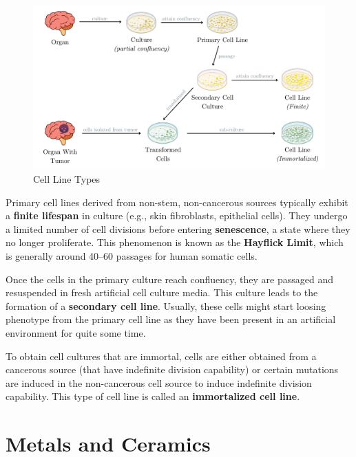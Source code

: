 \documentclass[12pt]{article}
\begin{document}
\begin{figure}[htbp]
    \centering
    \includegraphics[width=1\textwidth]{figures/chapter_1/cell_cultures.png}
    \caption{Cell Line Types}\label{fig:cell_line_types}
\end{figure}

Primary cell lines derived from non-stem, non-cancerous sources typically
exhibit a \textbf{finite lifespan} in culture (e.g., skin fibroblasts,
epithelial cells). They undergo a limited number of cell divisions before
entering \textbf{senescence}, a state where they no longer proliferate. This
phenomenon is known as the \textbf{Hayflick Limit}, which is generally around
40--60 passages for human somatic cells.

Once the cells in the primary culture reach confluency, they are passaged and
resuspended in fresh artificial cell culture media. This culture leads to the
formation of a \textbf{secondary cell line}. Usually, these cells might start
loosing phenotype from the primary cell line as they have been present in an
artificial environment for quite some time.

To obtain cell cultures that are immortal, cells are either obtained from a
cancerous source (that have indefinite division capability) or certain
mutations are induced in the non-cancerous cell source to induce indefinite
division capability. This type of cell line is called an \textbf{immortalized
    cell line}.

\section{Metals and Ceramics}
\end{document}

